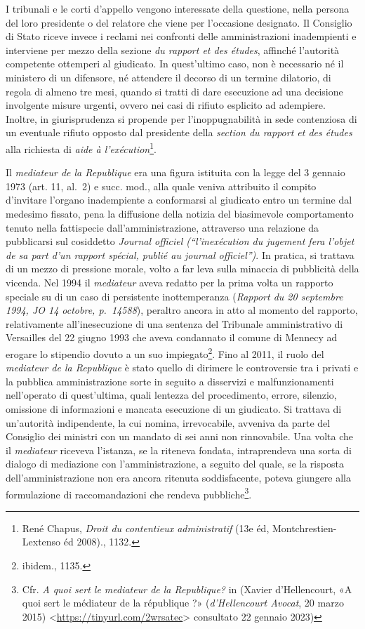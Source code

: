 \documentclass[12pt,it,a4paper,]{report}
\begin{document}
I tribunali e le corti d'appello vengono interessate della questione,
nella persona del loro presidente o del relatore che viene per
l'occasione designato. Il Consiglio di Stato riceve invece i reclami nei
confronti delle amministrazioni inadempienti e interviene per mezzo
della sezione \emph{du rapport et des études}, affinché l'autorità
competente ottemperi al giudicato. In quest'ultimo caso, non è
necessario né il ministero di un difensore, né attendere il decorso di
un termine dilatorio, di regola di almeno tre mesi, quando si tratti di
dare esecuzione ad una decisione involgente misure urgenti, ovvero nei
casi di rifiuto esplicito ad adempiere. Inoltre, in giurisprudenza si
propende per l'inoppugnabilità in sede contenziosa di un eventuale
rifiuto opposto dal presidente della \emph{section du rapport et des
études} alla richiesta di \emph{aide à l'exécution}\footnote{{René
  Chapus, \emph{Droit du contentieux administratif} (13e éd,
  Montchrestien-Lextenso éd 2008).}, 1132.}.

Il \emph{mediateur de la Republique} era una figura istituita con la
legge del 3 gennaio 1973 (art. 11, al.~2) e succ. mod., alla quale
veniva attribuito il compito d'invitare l'organo inadempiente a
conformarsi al giudicato entro un termine dal medesimo fissato, pena la
diffusione della notizia del biasimevole comportamento tenuto nella
fattispecie dall'amministrazione, attraverso una relazione da
pubblicarsi sul cosiddetto \emph{Journal officiel (``l'inexécution du
jugement fera l'objet de sa part d'un rapport spécial, publié au journal
officiel'')}. In pratica, si trattava di un mezzo di pressione morale,
volto a far leva sulla minaccia di pubblicità della vicenda. Nel 1994 il
\emph{mediateur} aveva redatto per la prima volta un rapporto speciale
su di un caso di persistente inottemperanza (\emph{Rapport du 20
septembre 1994, JO 14 octobre, p.~14588}), peraltro ancora in atto al
momento del rapporto, relativamente all'inesecuzione di una sentenza del
Tribunale amministrativo di Versailles del 22 giugno 1993 che aveva
condannato il comune di Mennecy ad erogare lo stipendio dovuto a un suo
impiegato\footnote{{ibidem.}, 1135.}. Fino al 2011, il ruolo del
\emph{mediateur de la Republique} è stato quello di dirimere le
controversie tra i privati e la pubblica amministrazione sorte in
seguito a disservizi e malfunzionamenti nell'operato di quest'ultima,
quali lentezza del procedimento, errore, silenzio, omissione di
informazioni e mancata esecuzione di un giudicato. Si trattava di
un'autorità indipendente, la cui nomina, irrevocabile, avveniva da parte
del Consiglio dei ministri con un mandato di sei anni non rinnovabile.
Una volta che il \emph{mediateur} riceveva l'istanza, se la riteneva
fondata, intraprendeva una sorta di dialogo di mediazione con
l'amministrazione, a seguito del quale, se la risposta
dell'amministrazione non era ancora ritenuta soddisfacente, poteva
giungere alla formulazione di raccomandazioni che rendeva
pubbliche\footnote{Cfr. \emph{A quoi sert le mediateur de la
  Republique?} in (Xavier d'Hellencourt, {«A quoi sert le médiateur de
  la république ?»} (\emph{d'Hellencourt Avocat}, 20 marzo 2015)
  \textless{}\url{https://tinyurl.com/2wrsatec}\textgreater{} consultato
  22 gennaio 2023)}.
\end{document}
